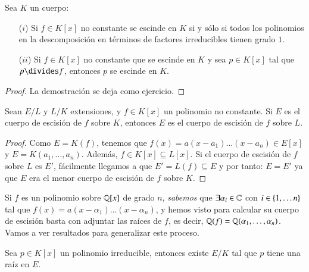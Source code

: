 \begin{lm}\label{lm:3.1}
    Sea $K$ un cuerpo:\\
    \begin{enumerate}
        \item[($i$)] Si $f \in K[x]$ no constante se escinde en $K$ si y sólo si todos los polinomios en la descomposición en términos de factores irreducibles tienen grado $1$.
        \item[($ii$)] Si $f \in K[x]$ no constante que se escinde en $K$ y sea $p \in K[x]$ tal que $p \divides f$, entonces $p$ se escinde en $K$.
    \end{enumerate}
\end{lm}

\begin{proof}
    La demostración se deja como ejercicio.
\end{proof}

\begin{lm}\label{lm:3.2}
    Sean $E/L$ y $L/K$ extensiones, y $f \in K[x]$ un polinomio no constante. Si $E$ es el cuerpo de escisión de $f$ sobre $K$, entonces $E$ es el cuerpo de escisión de $f$ sobre $L$.
\end{lm}

\begin{proof}
    Como $E = K(f)$, tenemos que $f(x) = a (x - a_1) \ldots (x - a_n) \in E[x]$ y $E = K(a_1, \ldots, a_n)$. Además, $f \in K[x] \subseteq L[x]$. Si el cuerpo de escisión de $f$ sobre $L$ es $E'$, fácilmente llegamos a que $E' = L(f) \subseteq E$ y por tanto: $E = E'$ ya que $E$ era el menor cuerpo de escisión de $f$ sobre $K$.
\end{proof}

Si $f$ es un polinomio sobre $\mathbb{Q}[x]$ de grado $n$, \textit{sabemos} que $\exists \alpha_i \in \mathbb{C}$ con $i \in \left\{1, \ldots n\right\}$ tal que $f(x) = a (x - \alpha_1) \ldots (x - \alpha_n)$, y hemos visto para calcular su cuerpo de escisión basta con adjuntar las raíces de $f$, es decir, $\mathbb{Q}(f) = \mathbb{Q}(\alpha_1, \ldots, \alpha_n)$.\\

Vamos a ver resultados para generalizar este proceso.

\begin{lm}\label{lm:3.3}
    Sea $p \in K[x]$ un polinomio irreducible, entonces existe $E/K$ tal que $p$ tiene una raíz en $E$.
\end{lm}

